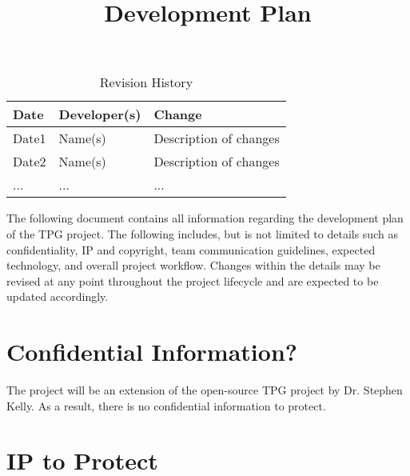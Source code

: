 \documentclass{article}
\title{Development Plan\\\progname}
\author{\authname}
\date{}
\begin{document}
\maketitle

\begin{table}[hp]
\caption{Revision History} \label{TblRevisionHistory}
\begin{tabularx}{\textwidth}{llX}
\toprule
\textbf{Date} & \textbf{Developer(s)} & \textbf{Change}\\
\midrule
Date1 & Name(s) & Description of changes\\
Date2 & Name(s) & Description of changes\\
... & ... & ...\\
\bottomrule
\end{tabularx}
\end{table}

\newpage{}



\noindent The following document contains all information regarding the development plan of the TPG project. The following includes, but is not limited to details such as confidentiality, IP and copyright, team communication guidelines, expected technology, and overall project workflow. Changes within the details may be revised at any point throughout the project lifecycle and are expected to be updated accordingly.
\section{Confidential Information?}



The project will be an extension of the open-source TPG project by Dr. Stephen Kelly. As a result, there is no confidential information to protect.
\section{IP to Protect}
\end{document}
